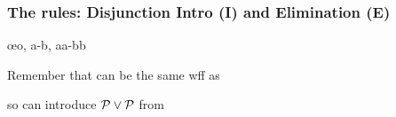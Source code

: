 \begin{frame}\footnotesize
  \frametitle{The rules: Disjunction Intro (\eor I) and Elimination (\eor E)}
\begin{multicols}{2}

  \begin{center}
    \begin{fitchproof}
      \open
       
      \ellipsesline
      \close
\breakline %
      \open
       
      \ellipsesline
      \close
       \oe{o, a-b, aa-bb}
    \end{fitchproof} 
    \end{center}

\columnbreak
  
  \begin{center}
      \begin{fitchproof}
         
      \end{fitchproof}
      \begin{fitchproof}
         
      \end{fitchproof}
       \end{center}
       
       Remember that  can be the same wff as 
       
       so can introduce $\mathcal{P} \vee \mathcal{P}$ from 
\end{multicols}
\end{frame}

